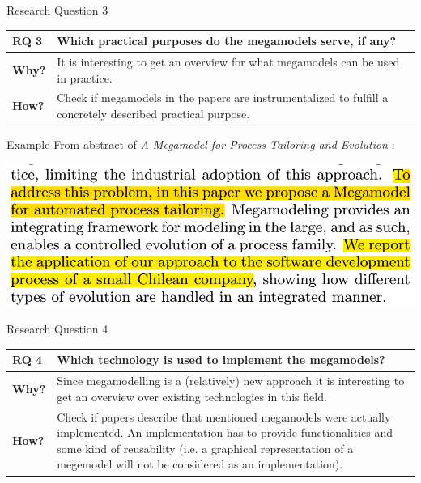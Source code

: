 \documentclass{beamer}
\begin{document}
\begin{frame}{Research Question 3}
\begin{tabular}{|l|p{9cm}|}\hline
\textbf{RQ 3} & Which practical purposes do the megamodels serve, if any?\\\hline
\textbf{Why?} & It is interesting to get an overview for what megamodels can be used in practice.\\\hline
\textbf{How?} & Check if megamodels in the papers are 	instrumentalized to fulfill a concretely described practical purpose.\\\hline
\end{tabular}
\end{frame}

\begin{frame}{Example}
From abstract of \textit{A Megamodel for Process Tailoring and Evolution} \cite{tailoring}:
\begin{center}
\includegraphics[width=1.0\textwidth]{ex_rq3}
\end{center}
\end{frame}

\begin{frame}{Research Question 4}
\begin{tabular}{|l|p{9cm}|}\hline
\textbf{RQ 4} & Which technology is used to implement the megamodels?\\\hline
\textbf{Why?} & Since megamodelling is a (relatively) new approach it is interesting to get an overview over existing technologies in this field.\\\hline
\textbf{How?} & Check if papers describe that mentioned megamodels were actually implemented. An implementation has to provide functionalities and some kind of reusability (i.e. a graphical representation of a megemodel will not be considered as an implementation).\\\hline
\end{tabular}
\end{frame}
\end{document}

